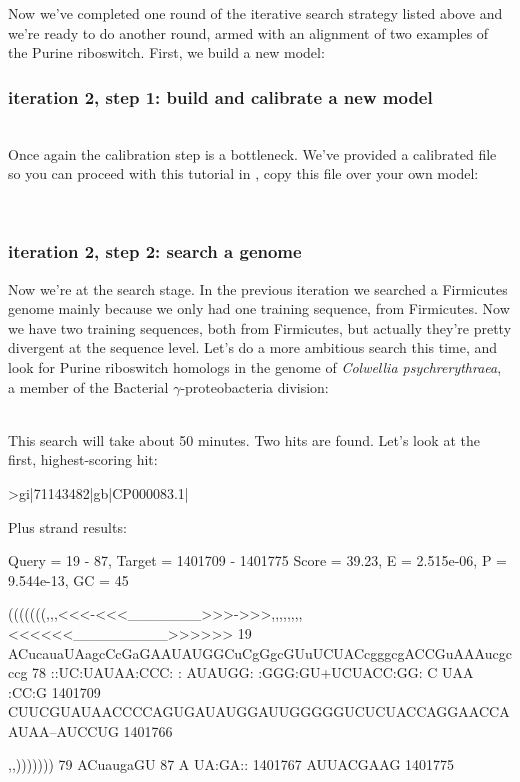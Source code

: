 
Now we've completed one round of the iterative search strategy listed
above and we're ready to do another round, armed with an alignment of
two examples of the Purine riboswitch. First, we build a new model:

\subsubsection{iteration 2, step 1: build and calibrate a new model}
\\

Once again the calibration step is a bottleneck. We've provided a
calibrated file so you can proceed with this tutorial in
, copy this file over your own model:

\\

\subsubsection{iteration 2, step 2: search a genome}

Now we're at the search stage. In the previous iteration we searched a
Firmicutes genome mainly because we only had one training sequence, from
Firmicutes. Now we have two training sequences, both from Firmicutes,
but actually they're pretty divergent at the sequence level. Let's do a
more ambitious search this time, and look for Purine riboswitch
homologs in the genome of \emph{Colwellia psychrerythraea}, a member of the
Bacterial $\gamma$-proteobacteria division:

\\

This search will take about 50 minutes. Two hits are found. Let's look
at the first, highest-scoring hit:

{\samepage
\begin{sreoutput}
>gi|71143482|gb|CP000083.1|

  Plus strand results:

 Query = 19 - 87, Target = 1401709 - 1401775
 Score = 39.23, E = 2.515e-06, P = 9.544e-13, GC =  45

           (((((((,,,<<<-<<<_______>>>->>>,,,,,,,,<<<<<<_________>>>>>>
        19 ACucauaUAagcCcGaGAAUAUGGCuCgGgcGUuUCUACcgggcgACCGuAAAucgcccg 78      
           ::UC:UAUAA:CCC: : AUAUGG: :GGG:GU+UCUACC:GG:  C  UAA   :CC:G
   1401709 CUUCGUAUAACCCCAGUGAUAUGGAUUGGGGGUCUCUACCAGGAACCAAUAA--AUCCUG 1401766 

           ,,)))))))
        79 ACuaugaGU 87      
           A UA:GA::
   1401767 AUUACGAAG 1401775 
\end{sreoutput}
}

